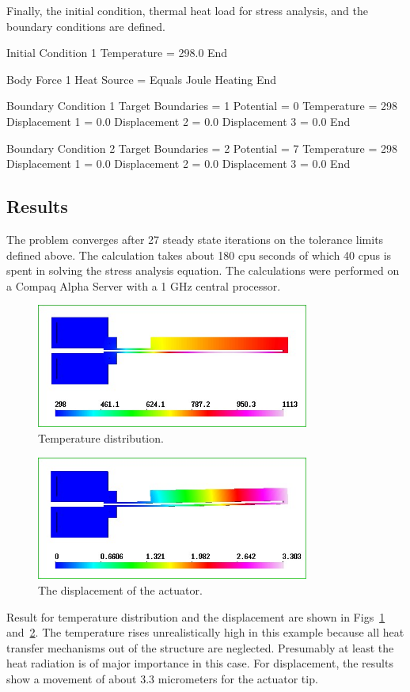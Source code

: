 Finally, the initial condition, thermal heat load for stress analysis,
and the boundary conditions are defined.

\ttbegin
Initial Condition 1
   Temperature = 298.0
End

Body Force 1
  Heat Source = Equals Joule Heating
End

Boundary Condition 1
  Target Boundaries = 1
  Potential = 0
  Temperature = 298
  Displacement 1 = 0.0
  Displacement 2 = 0.0
  Displacement 3 = 0.0
End

Boundary Condition 2
  Target Boundaries = 2
  Potential = 7
  Temperature = 298
  Displacement 1 = 0.0
  Displacement 2 = 0.0
  Displacement 3 = 0.0
End
\ttend

\subsection*{Results}

The problem converges after 27 steady state iterations on the
tolerance limits defined above. The calculation takes about 180 cpu
seconds of which 40 cpus is spent in solving the stress analysis
equation. The calculations were performed on a Compaq Alpha Server
with a 1 GHz central processor.

\begin{figure}[tbhp]
  \centerline{\includegraphics[width=0.8\textwidth]{temp_wh}}
  \caption{Temperature distribution.} 
  \label{temp_thermal}
\end{figure}
\begin{figure}[h]
  \centerline{\includegraphics[width=0.8\textwidth]{displ_wh}}
  \caption{The displacement of the actuator.} 
  \label{displ_thermal}
\end{figure}

Result for temperature distribution and the displacement are shown in
Figs~\ref{temp_thermal} and~\ref{displ_thermal}. The temperature rises
unrealistically high in this example because all heat transfer
mechanisms out of the structure are neglected. Presumably at least
the heat radiation is of major importance in this case. For
displacement, the results show a movement of about 3.3 micrometers for
the actuator tip.

\vfill
\mbox{}

